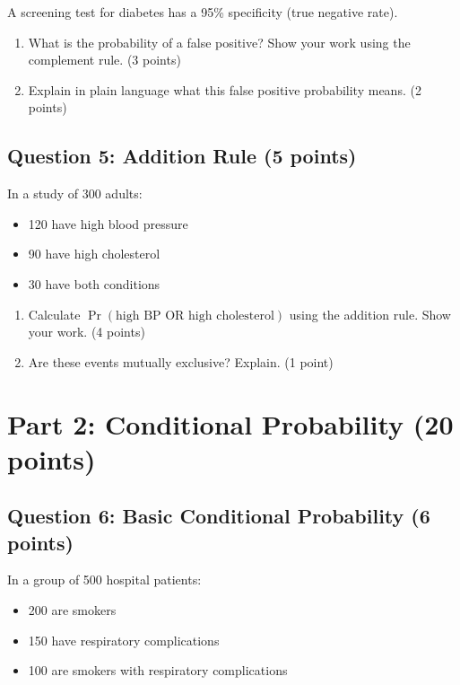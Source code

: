 \documentclass[11pt]{article}
\begin{document}
A screening test for diabetes has a 95\% specificity (true negative rate).

\begin{enumerate}[label=\alph*)]
\item What is the probability of a false positive? Show your work using the complement rule. (3 points)
\item Explain in plain language what this false positive probability means. (2 points)
\end{enumerate}

\vspace{1.5cm}

\subsection*{Question 5: Addition Rule (5 points)}

In a study of 300 adults:
\begin{itemize}
\item 120 have high blood pressure
\item 90 have high cholesterol
\item 30 have both conditions
\end{itemize}

\begin{enumerate}[label=\alph*)]
\item Calculate $\Pr(\text{high BP OR high cholesterol})$ using the addition rule. Show your work. (4 points)
\item Are these events mutually exclusive? Explain. (1 point)
\end{enumerate}

\vspace{1.5cm}

\section{Part 2: Conditional Probability (20 points)}

\subsection*{Question 6: Basic Conditional Probability (6 points)}

In a group of 500 hospital patients:
\begin{itemize}
\item 200 are smokers
\item 150 have respiratory complications
\item 100 are smokers with respiratory complications
\end{itemize}
\end{document}
